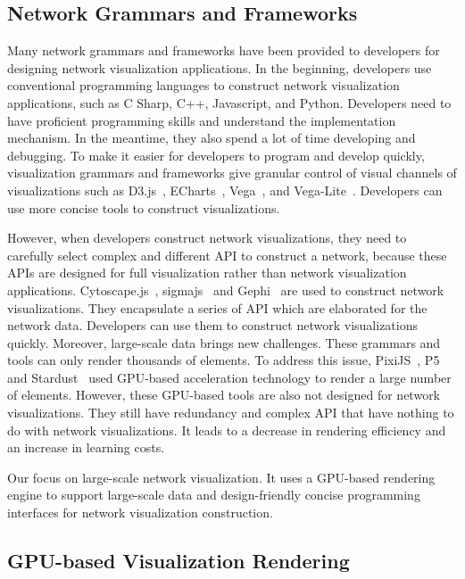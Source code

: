 \subsection{Network Grammars and Frameworks}
Many network grammars and frameworks have been provided to developers for designing network visualization applications.
In the beginning, developers use conventional programming languages to construct network visualization applications, such as C Sharp, C++, Javascript, and Python. Developers need to have proficient programming skills and understand the implementation mechanism.
In the meantime, they also spend a lot of time developing and debugging. To make it easier for developers to program and develop quickly, visualization grammars and frameworks give granular control of visual channels of visualizations such as D3.js~\cite{DBLP:journals/tvcg/BostockOH11}, ECharts~\cite{DBLP:journals/vi/LiMSSZWZC18}, Vega~\cite{DBLP:journals/tvcg/SatyanarayanRHH16}, and Vega-Lite~\cite{DBLP:journals/tvcg/SatyanarayanMWH17}. Developers can use more concise tools to construct visualizations.


However, when developers construct network visualizations, they need to carefully select complex and different API to construct a network, because these APIs are designed for full visualization rather than network visualization applications. Cytoscape.js~\cite{DBLP:journals/bioinformatics/FranzLHDSB16}, sigmajs~\cite{DBLP:journals/jossw/Coene18} and Gephi~\cite{DBLP:conf/icwsm/BastianHJ09} are used to construct network visualizations. They encapsulate a series of API which are elaborated for the network data. Developers can use them to construct network visualizations quickly.
Moreover, large-scale data brings new challenges. These grammars and tools can only render thousands of elements. To address this issue, PixiJS~\cite{graphicslearn}, P5~\cite{DBLP:journals/tvcg/LiM20} and Stardust~\cite{DBLP:journals/cgf/RenLH17} used GPU-based acceleration technology to render a large number of elements.
However, these GPU-based tools are also not designed for network visualizations.
They still have redundancy and complex API that have nothing to do with network visualizations. It leads to a decrease in rendering efficiency and an increase in learning costs.

Our \name focus on large-scale network visualization. It uses a GPU-based rendering engine to support large-scale data and design-friendly concise programming interfaces for network visualization construction.

\subsection{GPU-based Visualization Rendering}





